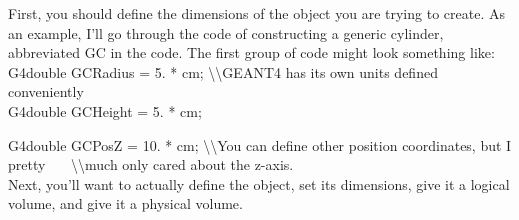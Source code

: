 \documentclass[%
12pt,
twoside,
reprint,
amsmath,amssymb,
aps,
]{article}
\begin{document}
	\noindent First, you should define the dimensions of the object you are trying to create. As an example, I'll go through the code of constructing a generic cylinder, abbreviated GC in the code. The first group of code might look something like: \\
	
	\noindent G4double GCRadius = 5. * cm; \textbackslash\textbackslash GEANT4 has its own units defined conveniently \\
	G4double GCHeight = 5. * cm;
	
	\noindent G4double GCPosZ   = 10. * cm; \textbackslash\textbackslash You can define other position coordinates, but I pretty
	\indent \indent \indent \indent \indent \indent \indent \indent \indent \ \ \ \textbackslash\textbackslash much only cared about the z-axis. \\
	
	\noindent Next, you'll want to actually define the object, set its dimensions, give it a logical volume, and give it a physical volume.
	
\end{document}
